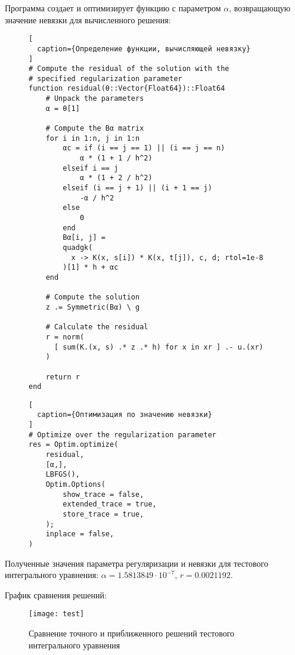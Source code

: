 Программа создает и оптимизирует функцию с параметром $ \alpha $, возвращающую значение невязки для вычисленного решения:

\begin{figure}[h!]
\begin{lstlisting}[
  caption={Определение функции, вычисляющей невязку}
]
# Compute the residual of the solution with the
# specified regularization parameter
function residual(θ::Vector{Float64})::Float64
    # Unpack the parameters
    α = θ[1]

    # Compute the Bα matrix
    for i in 1:n, j in 1:n
        αc = if (i == j == 1) || (i == j == n)
            α * (1 + 1 / h^2)
        elseif i == j
            α * (1 + 2 / h^2)
        elseif (i == j + 1) || (i + 1 == j)
            -α / h^2
        else
            0
        end
        Bα[i, j] =
        quadgk(
          x -> K(x, s[i]) * K(x, t[j]), c, d; rtol=1e-8
        )[1] * h + αc
    end

    # Compute the solution
    z .= Symmetric(Bα) \ g

    # Calculate the residual
    r = norm(
      [ sum(K.(x, s) .* z .* h) for x in xr ] .- u.(xr)
    )

    return r
end
\end{lstlisting}
\end{figure}

\newpage

\begin{figure}[h!]
\begin{lstlisting}[
  caption={Оптимизация по значению невязки}
]
# Optimize over the regularization parameter
res = Optim.optimize(
    residual,
    [α,],
    LBFGS(),
    Optim.Options(
        show_trace = false,
        extended_trace = true,
        store_trace = true,
    );
    inplace = false,
)
\end{lstlisting}
\end{figure}

Полученные значения параметра регуляризации и невязки для тестового интегрального уравнения: $ \alpha = 1.5813849 \cdot 10^{-7} $,
$r = 0.0021192 $. \npar

График сравнения решений:

\captionsetup{justification=centering}

\begin{figure}[h!]
  \centering
  \texttt{[image: test]}
  \caption{Сравнение точного и приближенного решений тестового интегрального уравнения}
\end{figure}

